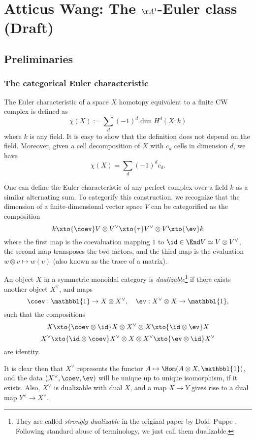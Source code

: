 \section{Atticus Wang: The $\AA^1$-Euler class (Draft)}

\subsection{Preliminaries}

\subsubsection{The categorical Euler characteristic}

The Euler characteristic of a space $X$ homotopy equivalent to a finite CW complex is defined as
\[\chi(X):=\sum_d(-1)^d \dim H^d(X;k)\]
where $k$ is any field. It is easy to show that the definition does not depend on the field. Moreover, given a cell decomposition of $X$ with $c_d$ cells in dimension $d$, we have
\[\chi(X)=\sum_d (-1)^d c_d.\]


One can define the Euler characteristic of any perfect complex over a field $k$ as a similar alternating sum. To categorify this construction, we recognize that the dimension of a finite-dimensional vector space $V$ can be categorified as the composition
\[k \xto{\coev} V \otimes V^\vee \xto{\tau} V^\vee \otimes V \xto{\ev} k\]
where the first map is the coevaluation mapping $1$ to $\id\in \End V\simeq V\otimes V^\vee$, the second map transposes the two factors, and the third map is the evaluation $w\otimes v\mapsto w(v)$ (also known as the trace of a matrix). 

\begin{definition}

An object $X$ in a symmetric monoidal category is \emph{dualizable}\footnote{They are called \emph{strongly dualizable} in the original paper by Dold--Puppe \cite{DoldPuppe}. Following standard abuse of terminology, we just call them dualizable.} if there exists another object $X^\vee$, and maps 
\[\coev: \mathbbl{1}\to X\otimes X^\vee, \quad \ev: X^\vee\otimes X\to \mathbbl{1}, \]
such that the compositions
\[X\xto{\coev\otimes \id} X\otimes X^\vee\otimes X \xto{\id\otimes \ev} X \]
\[X^\vee\xto{\id\otimes \coev} X^\vee\otimes X \otimes X^\vee \xto{\ev\otimes \id} X^\vee\]
are identity.

\end{definition}

It is clear then that $X^\vee$ represents the functor $A\mapsto \Hom(A\otimes X, \mathbbl{1})$, and the data $(X^\vee, \coev, \ev)$ will be unique up to unique isomorphism, if it exists. Also, $X^\vee$ is dualizable with dual $X$, and a map $X\to Y$ gives rise to a dual map $Y^\vee \to X^\vee$.

